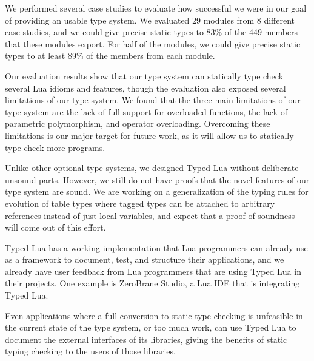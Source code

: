 \documentclass{sigplanconf}
\begin{document}
We performed several
case studies to evaluate how successful we were in our goal of
providing an usable type system.
We evaluated 29 modules from 8 different case studies,
and we could give precise static types to 83\% of the 449
members that these modules export.
For half of the modules, we could give precise static types to
at least 89\% of the members from each module.

Our evaluation results show that our type system can statically
type check several Lua idioms and features, though the evaluation
also exposed several limitations of our type system.
We found that the three main limitations of our type system are
the lack of full support for overloaded functions, the lack
of parametric polymorphism, and operator overloading.
Overcoming these limitations is our major target for future work,
as it will allow us to statically type check more programs.

Unlike other optional type systems, we designed Typed Lua without
deliberate unsound parts.
However, we still do not have proofs that the novel features of
our type system are sound. We are working on a generalization
of the typing rules for evolution of table types where tagged
types can be attached to arbitrary references instead of
just local variables, and expect that a proof of soundness
will come out of this effort.

Typed Lua has a working implementation that
Lua programmers can already use as a framework to
document, test, and structure their applications,
and we already have user feedback from Lua programmers
that are using Typed Lua in their projects.
One example is ZeroBrane Studio, a Lua IDE that is
integrating Typed Lua.

Even applications where a full conversion to static
type checking is unfeasible in the current state
of the type system, or too much work, can use Typed
Lua to document the external interfaces of its
libraries, giving the benefits of static typing
checking to the users of those libraries.



\end{document}
